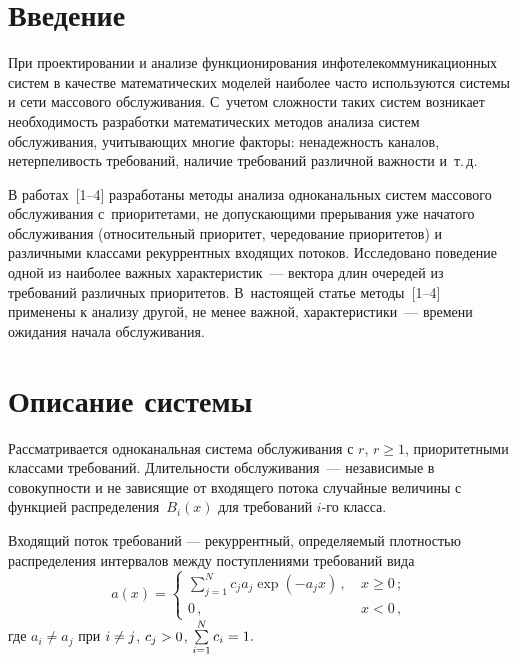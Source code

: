       \begin{multicols}{2}
      
            \label{st\stat}


\section{Введение}

При проектировании и анализе функционирования
инфотелекоммуникационных сис\-тем в качест\-ве математических моделей
наиболее часто используются сис\-те\-мы и сети массового обслуживания. 
С~учетом сложности таких систем возникает необходимость разработки
математических методов анализа систем обслуживания, учитывающих
многие факторы: ненадежность каналов, нетерпеливость требований,
наличие требований различной важности и~т.\,д.

В работах~[1--4] разработаны методы анализа одноканальных сис\-тем массового обслуживания
с~приоритетами, не допускающими прерывания
уже начатого обслуживания (относительный приоритет, чередование приоритетов) 
и различными классами рекуррентных входящих потоков. Иссле\-довано
поведение одной из наиболее важных характеристик~--- вектора длин очередей из 
требований различных приоритетов. В~настоящей статье методы~[1--4] 
применены к анализу другой, не менее важной, характеристики~--- времени ожидания 
начала обслуживания.

\section{Описание системы}


Рассматривается одноканальная сис\-те\-ма обслуживания с $r$, $r\geqslant 1$, приоритетными 
классами требований. Длительности обслуживания~---
независимые в совокупности и не зависящие от входящего потока случайные величины с функцией 
распределения~$B_i(x)$ для требований $i$-го класса.

Входящий поток требований --- рекуррентный, определяемый плот\-ностью распределения 
интервалов между поступлениями требований вида
\begin{equation}
a(x)=
\begin{cases}
\sum\limits_{j=1}^{N}c_ja_j\exp\left(-a_jx\right)\,,&\  x\geqslant 0\,;\\
0\,,&\ x<0\,,
\end{cases}
\label{e1-u}
\end{equation}
где $a_i\ne a_j$ при $i\hm\ne j$, $c_j\hm>0$, $\sum\limits_{i=1}^{N}c_i\hm=1.$


\end{multicols}
